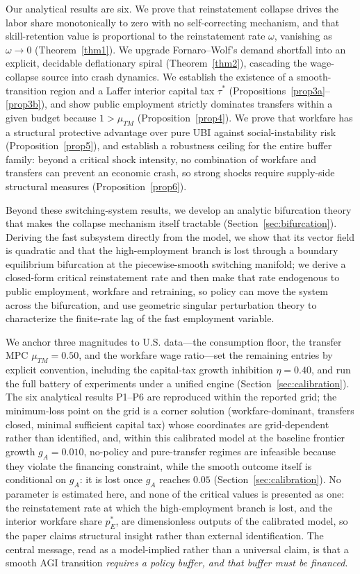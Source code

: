 \documentclass[review,12pt]{elsarticle}
\theoremstyle{plain}
\theoremstyle{definition}
\theoremstyle{remark}
\begin{document}
Our analytical results are six. We prove that reinstatement collapse drives the labor share monotonically to zero with no self-correcting mechanism, and that skill-retention value is proportional to the reinstatement rate $\omega$, vanishing as $\omega\to0$ (Theorem~\ref{thm1}). We upgrade Fornaro--Wolf's demand shortfall into an explicit, decidable deflationary spiral (Theorem~\ref{thm2}), cascading the wage-collapse source into crash dynamics. We establish the existence of a smooth-transition region and a Laffer interior capital tax $\tau^*$ (Propositions~\ref{prop3a}--\ref{prop3b}), and show public employment strictly dominates transfers within a given budget because $1>\mu_{TM}$ (Proposition~\ref{prop4}). We prove that workfare has a structural protective advantage over pure UBI against social-instability risk (Proposition~\ref{prop5}), and establish a robustness ceiling for the entire buffer family: beyond a critical shock intensity, no combination of workfare and transfers can prevent an economic crash, so strong shocks require supply-side structural measures (Proposition~\ref{prop6}).

Beyond these switching-system results, we develop an analytic bifurcation theory that makes the collapse mechanism itself tractable (Section~\ref{sec:bifurcation}). Deriving the fast subsystem directly from the model, we show that its vector field is quadratic and that the high-employment branch is lost through a boundary equilibrium bifurcation at the piecewise-smooth switching manifold; we derive a closed-form critical reinstatement rate and then make that rate endogenous to public employment, workfare and retraining, so policy can move the system across the bifurcation, and use geometric singular perturbation theory to characterize the finite-rate lag of the fast employment variable.

We anchor three magnitudes to U.S. data---the consumption floor, the transfer MPC $\mu_{TM}=0.50$, and the workfare wage ratio---set the remaining entries by explicit convention, including the capital-tax growth inhibition $\eta=0.40$, and run the full battery of experiments under a unified engine (Section~\ref{sec:calibration}). The six analytical results P1--P6 are reproduced within the reported grid; the minimum-loss point on the grid is a corner solution (workfare-dominant, transfers closed, minimal sufficient capital tax) whose coordinates are grid-dependent rather than identified, and, within this calibrated model at the baseline frontier growth $g_A=0.010$, no-policy and pure-transfer regimes are infeasible because they violate the financing constraint, while the smooth outcome itself is conditional on $g_A$: it is lost once $g_A$ reaches $0.05$ (Section~\ref{sec:calibration}). No parameter is estimated here, and none of the critical values is presented as one: the reinstatement rate at which the high-employment branch is lost, and the interior workfare share $p_E^*$, are dimensionless outputs of the calibrated model, so the paper claims structural insight rather than external identification. The central message, read as a model-implied rather than a universal claim, is that a smooth AGI transition \emph{requires a policy buffer, and that buffer must be financed}.
\end{document}
